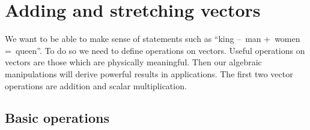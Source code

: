 
\section{Adding and stretching vectors}
\label{sec:asv}
\secttoc


We want to be able to make sense of statements such as ``king --~man +~women =~queen''.
To do so we need to define operations on vectors.
Useful operations on vectors are those which are physically meaningful.
Then our algebraic manipulations will derive powerful results in applications.
The first two vector operations are addition and scalar multiplication.


\subsection{Basic operations}

